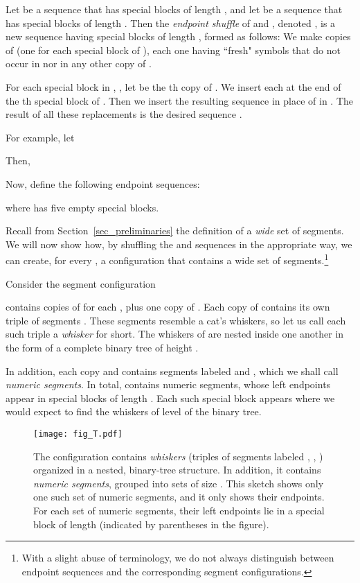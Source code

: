 \documentclass[11pt]{article}
\theoremstyle{definition}
\theoremstyle{remark}
\begin{document}
Let  be a sequence that has  special blocks of length , and let  be a sequence that has  special blocks of length . Then the \emph{endpoint shuffle} of  and , denoted , is a new sequence having  special blocks of length , formed as follows: We make  copies of  (one for each special block of ), each one having ``fresh" symbols that do not occur in  nor in any other copy of .

For each special block  in , , let  be the th copy of . We insert each  at the end of the th special block of . Then we insert the resulting sequence in place of  in . The result of all these replacements is the desired sequence .

For example, let 

Then,


Now, define the following endpoint sequences:

where  has five empty special blocks.

Recall from Section~\ref{sec_preliminaries} the definition of a \emph{wide} set of segments. We will now show how, by shuffling the  and  sequences in the appropriate way, we can create, for every , a configuration that contains a wide set of  segments.\footnote{With a slight abuse of terminology, we do not always distinguish between endpoint sequences and the corresponding segment configurations.}

Consider the segment configuration

 contains  copies of  for each , plus one copy of . Each copy of  contains its own triple of segments . These segments resemble a cat's whiskers, so let us call each such triple  a \emph{whisker} for short. The whiskers of  are nested inside one another in the form of a complete binary tree of height .

In addition, each copy  and  contains segments labeled  and , which we shall call \emph{numeric segments}. In total,  contains  numeric segments, whose left endpoints appear in  special blocks of length . Each such special block appears where we would expect to find the whiskers of level  of the binary tree.

\begin{figure}
\centerline{\texttt{[image: fig\_T.pdf]}}
\caption{\label{fig_T}The configuration  contains \emph{whiskers} (triples of segments labeled , , ) organized in a nested, binary-tree structure. In addition, it contains \emph{numeric segments}, grouped into sets of size . This sketch shows only one such set of numeric segments, and it only shows their endpoints. For each set of numeric segments, their left endpoints lie in a special block of length  (indicated by parentheses in the figure).}
\end{figure}
\end{document}
